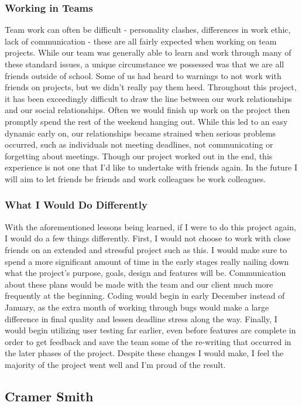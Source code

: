\documentclass[letterpaper,10pt,titlepage,draftclsnofoot,onecolumn,onesided] {IEEEtran}
\begin{document}
\subsubsection{Working in Teams}
Team work can often be difficult - personality clashes, differences in work ethic, lack of communication - these are all fairly expected when working on team projects. 
While our team was generally able to learn and work through many of these standard issues, a unique circumstance we possessed was that we are all friends outside of school.
Some of us had heard to warnings to not work with friends on projects, but we didn't really pay them heed.
Throughout this project, it has been exceedingly difficult to draw the line between our work relationships and our social relationships. 
Often we would finish up work on the project then promptly spend the rest of the weekend hanging out.
While this led to an easy dynamic early on, our relationships became strained when serious problems occurred, such as individuals not meeting deadlines, not communicating or forgetting about meetings.
Though our project worked out in the end, this experience is not one that I'd like to undertake with friends again.
In the future I will aim to let friends be friends and work colleagues be work colleagues.

\subsubsection{What I Would Do Differently}
With the aforementioned lessons being learned, if I were to do this project again, I would do a few things differently.
First, I would not choose to work with close friends on an extended and stressful project such as this.
I would make sure to spend a more significant amount of time in the early stages really nailing down what the project's purpose, goals, design and features will be.
Communication about these plans would be made with the team and our client much more frequently at the beginning.
Coding would begin in early December instead of January, as the extra month of working through bugs would make a large difference in final quality and lessen deadline stress along the way.
Finally, I would begin utilizing user testing far earlier, even before features are complete in order to get feedback and save the team some of the re-writing that occurred in the later phases of the project.
Despite these changes I would make, I feel the majority of the project went well and I'm proud of the result.

\subsection{Cramer Smith}
\end{document}
